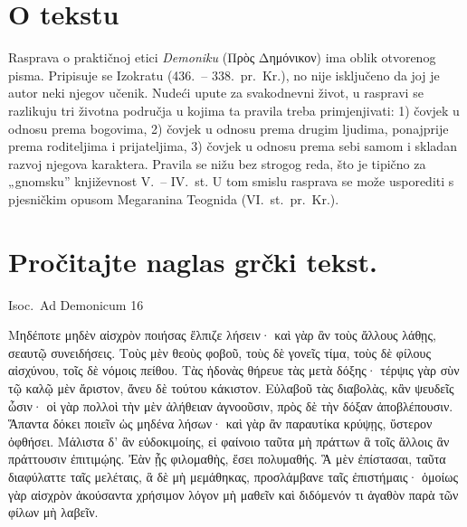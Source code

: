 


\section*{O tekstu}

Rasprava o praktičnoj etici \textit{Demoniku} \textgreek[variant=ancient]{(Πρὸς Δημόνικον)} ima oblik otvorenog pisma. Pripisuje se Izokratu (436.\ – 338.\ pr.~Kr.), no nije isključeno da joj je autor neki njegov učenik. Nudeći upute za svakodnevni život, u raspravi se razlikuju tri životna područja u kojima ta pravila treba primjenjivati: 1) čovjek u odnosu prema bogovima, 2) čovjek u odnosu prema drugim ljudima, ponajprije prema roditeljima i prijateljima, 3) čovjek u odnosu prema sebi samom i skladan razvoj njegova karaktera. Pravila se nižu bez strogog reda, što je tipično za „gnomsku'' književnost V.\ – IV.~st. U tom smislu rasprava se može usporediti s pjesničkim opusom Megaranina Teognida (VI.~st.\ pr.~Kr.).


\section*{Pročitajte naglas grčki tekst.}


Isoc.\ Ad Demonicum 16

\medskip

{\large
\begin{greek}
\noindent Μηδέποτε μηδὲν αἰσχρὸν ποιήσας ἔλπιζε λήσειν· καὶ γὰρ ἂν τοὺς ἄλλους λάθῃς, σεαυτῷ συνειδήσεις. Τοὺς μὲν θεοὺς φοβοῦ, τοὺς δὲ γονεῖς τίμα, τοὺς δὲ φίλους αἰσχύνου, τοῖς δὲ νόμοις πείθου. Τὰς ἡδονὰς θήρευε τὰς μετὰ δόξης· τέρψις γὰρ σὺν τῷ καλῷ μὲν ἄριστον, ἄνευ δὲ τούτου κάκιστον.  Εὐλαβοῦ τὰς διαβολὰς, κἂν ψευδεῖς ὦσιν· οἱ γὰρ πολλοὶ τὴν μὲν ἀλήθειαν ἀγνοοῦσιν, πρὸς δὲ τὴν δόξαν ἀποβλέπουσιν. Ἅπαντα δόκει ποιεῖν ὡς μηδένα λήσων· καὶ γὰρ ἂν παραυτίκα κρύψῃς, ὕστερον ὀφθήσει. Μάλιστα δ' ἂν εὐδοκιμοίης, εἰ φαίνοιο ταῦτα μὴ πράττων ἃ τοῖς ἄλλοις ἂν πράττουσιν ἐπιτιμῴης. Ἐὰν ᾖς φιλομαθὴς, ἔσει πολυμαθής. Ἃ μὲν ἐπίστασαι, ταῦτα διαφύλαττε ταῖς μελέταις, ἃ δὲ μὴ μεμάθηκας, προσλάμβανε ταῖς ἐπιστήμαις· ὁμοίως γὰρ αἰσχρὸν ἀκούσαντα χρήσιμον λόγον μὴ μαθεῖν καὶ διδόμενόν τι ἀγαθὸν παρὰ τῶν φίλων μὴ λαβεῖν.
 
\end{greek}

}

